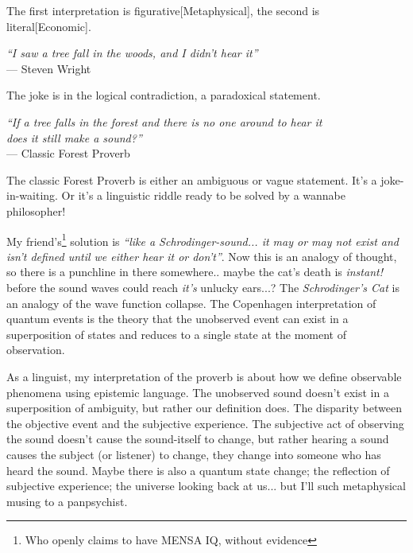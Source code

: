 \noindent
The first interpretation is figurative[Metaphysical], the second is literal[Economic].

\begin{center}
\textit{``I saw a tree fall in the woods, and I didn't hear it''}
\\ --- Steven Wright
\end{center}

\noindent
The joke is in the logical contradiction, a paradoxical statement.

\noindent
\begin{center}
\textit{``If a tree falls in the forest and there is no one around to hear it\\ does it still make a sound?''}
\\ --- Classic Forest Proverb
\end{center}

The classic Forest Proverb is either an ambiguous or vague statement. 
It's a joke-in-waiting. Or it's a linguistic riddle ready to be solved by a wannabe philosopher!


My friend's\footnote{Who openly claims to have MENSA IQ, without evidence} solution is \textit{``like a Schrodinger-sound... it may or may not exist and isn't defined until we either hear it or don't''}. Now this is an analogy of thought, so there is a punchline in there somewhere.. maybe the cat's death is \textit{instant!} before the sound waves could reach \textit{it's} unlucky ears...? The \textit{Schrodinger's Cat} is an analogy of the wave function collapse. The Copenhagen interpretation of quantum events is the theory that the unobserved event can exist in a superposition of states and reduces to a single state at the moment of observation.

As a linguist, my interpretation of the proverb is about how we define observable phenomena using epistemic language. The unobserved sound doesn't exist in a superposition of ambiguity, but rather our definition does. The disparity between the objective event and the subjective experience. %
The subjective act of observing the sound doesn't cause the sound-itself to change, but rather hearing a sound causes the subject (or listener) to change, they change into someone who has heard the sound. Maybe there is also a quantum state change; the reflection of subjective experience; the universe looking back at us... but I'll such metaphysical musing to a panpsychist.

